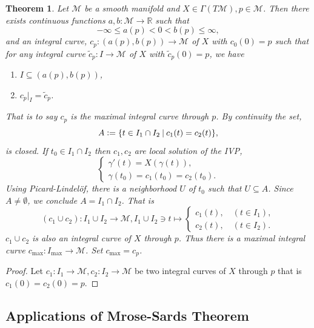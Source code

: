 \documentclass[8pt]{article}
\newtheorem{theorem}{Theorem} [section]
\newcommand{\defeq}{\vcentcolon=}
\newcommand{\R}[0]{\mathbb{R}}
\newcommand{\M}[0]{\mathcal{M}}
\newcommand{\sep}[0]{\:|\:}
\begin{document}
\begin{theorem}
  Let $\M$ be a smooth manifold and $X\in\Gamma(T\M), p\in\M$. Then there exists continuous functions $a,b:\M\to\R$ such that 
  \begin{equation*}
    -\infty \leq a(p)<0<b(p)\leq \infty,
  \end{equation*}
  and an integral curve, $c_p:(a(p),b(p))\to\M$ of $X$ with $c_0(0)=p$ such that for any integral curve $\tilde{c}_p:I\to\M$ of $X$ with $\tilde{c}_p(0)=p$, we have 
  \begin{enumerate}[1).]
    \item $I\subseteq(a(p),b(p))$,
    \item $c_p|_I = \tilde{c}_p$.
  \end{enumerate}
  That is to say $c_p$ is the maximal integral curve through $p$. By continuity the set,
  \begin{equation*}
    A\defeq  \{t\in I_1\cap I_2\sep c_1(t) = c_2(t)\},
  \end{equation*}
  is closed. If $t_0\in I_1\cap I_2$ then $c_1,c_2$ are local solution of the IVP,
  \begin{equation*}
    \begin{cases}
      \gamma'(t) = X(\gamma(t)),\\
      \gamma(t_0) = c_1(t_0) = c_2(t_0).
    \end{cases}
  \end{equation*}
  Using Picard-Lindelöf, there is a neighborhood $U$ of $t_0$ such that $U\subseteq A$. Since $A\not=\emptyset$, we conclude $A=I_1\cap I_2$. That is 
  \begin{equation*}
    (c_1\cup c_2):I_1\cup I_2\to\M, I_1\cup I_2\ni t\mapsto \begin{cases}
      c_1(t),\quad(t\in I_1),\\
      c_2(t), \quad (t\in I_2).
    \end{cases}
  \end{equation*}
  $c_1\cup c_2$ is also an integral curve of $X$ through $p$. Thus there is a maximal integral curve $c_{\max}:I_{\max}\to\M$. Set $c_{\max} = c_p$.
\end{theorem}

\begin{proof}
  Let $c_1:I_1\to\M,c_2:I_2\to\M$ be two integral curves of $X$ through $p$ that is $c_1(0)=c_2(0) = p$. 
\end{proof}

\subsection{Applications of Mrose-Sards Theorem}
\end{document}
